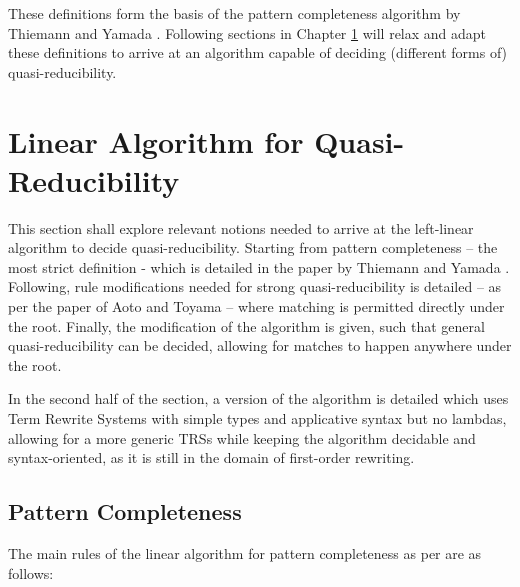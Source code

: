 \documentclass{report}
\theoremstyle{definition}
\begin{document}
These definitions form the basis of the pattern completeness algorithm by Thiemann and Yamada \cite{thiemann}. Following sections in Chapter \ref{chapter:alg} will relax and adapt these definitions to arrive at an algorithm capable of deciding (different forms of) quasi-reducibility.

\chapter{Linear Algorithm for Quasi-Reducibility}\label{chapter:alg}
This section shall explore relevant notions needed to arrive at the left-linear algorithm to decide quasi-reducibility. Starting from pattern completeness – the most strict definition - which is detailed in the paper by Thiemann and Yamada \cite{thiemann}. Following, rule modifications needed for strong quasi-reducibility is detailed – as per the paper of Aoto and Toyama \cite{aoto} – where matching is permitted directly under the root. Finally, the modification of the algorithm is given, such that general quasi-reducibility can be decided, allowing for matches to happen anywhere under the root. 

In the second half of the section, a version of the algorithm is detailed which uses Term Rewrite Systems with simple types and applicative syntax but no lambdas, allowing for a more generic TRSs while keeping the algorithm decidable and syntax-oriented, as it is still in the domain of first-order rewriting.

\section{Pattern Completeness}
The main rules of the linear algorithm for pattern completeness as per \cite{thiemann} are as follows:
\end{document}
